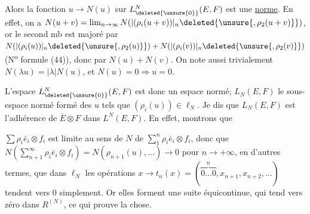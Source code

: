 
 

Alors la fonction $u\to N(u)$ sur $L^N_{\deleted{\unsure{0}}}(E,F)$ est une \uline{norme}. En effet, on a $N(u+v)=\lim_{n\to\infty}N(|(\rho_i(u+v))|_n\deleted{\unsure{,\rho_2(u+v)}})$, or le second mb est majoré par $N(|(\rho_i(u))|_n\deleted{\unsure{,\rho_2(u)}})+N(|(\rho_i(v))|_n\deleted{\unsure{,\rho_2(v)}})$ (N\textsuperscript{o} \unsure{,} formule (44)), donc par $N(u)+N(v)$. On note aussi trivialement $N(\lambda u)=|\lambda|N(u)$, et $N(u)=0\Rightarrow u=0$.


L'espace $L^N_{\deleted{\unsure{0}}}(E,F)$ est donc un espace normé;  $L_N(E,F)$ le sous-espace normé formé des $u$ tels que $(\rho_i(u))\in\ell_N$. Je dis que $L_N(E,F)$ est l'adhérence de $\overline E\otimes F$ dans $L^N(E,F)$. En effet, montrons que

$\sum\rho_i\bar e_i\otimes f_i$ est limite au sens de $N$ de $\sum_1^n\rho_i\bar e_i\otimes f_i$, donc que $N(\sum_{n+1}^\infty\rho_i\bar e_i\otimes f_i)=N(\rho_{n+1}(u),\ldots)\to 0$ pour $n\to+\infty$, en d'autres termes, que dans $\ell_N$ les opérations $x\to t_n(x)=(\overbrace{0\ldots 0}^{n},x_{n+1},x_{n+2},\ldots)$ tendent vers $0$ simplement. Or elles forment une suite équicontinue, qui tend vers zéro dans  $R^{(N)}$, ce qui prouve la chose. 



